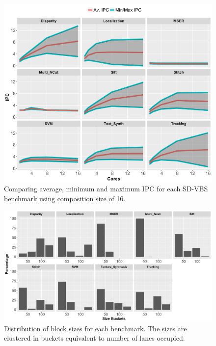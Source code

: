 \begin{figure}[t]
    \centering
    \includegraphics[width=1\textwidth]{cases-paper/graphics/Exploration/stddev3.pdf}
    \caption{Comparing average, minimum and maximum IPC for each SD-VBS benchmark using composition size of 16.}
    \label{fig:stddev}
		\vspace{5mm}
\end{figure}

\begin{figure}[t]
    \centering
    \includegraphics[width=1\textwidth]{cases-paper/graphics/Exploration/SizeBuckets.pdf}
	\vspace{-1em}
    \caption{Distribution of block sizes for each benchmark. The sizes are clustered in buckets equivalent to number of lanes occupied.}
    \label{fig:block_sizes}
	\vspace{5mm}
\end{figure}

